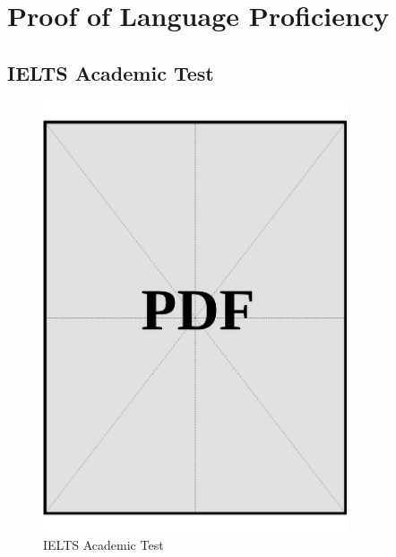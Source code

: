 \chapter{Proof of Language Proficiency}\label{sec:proof-of-language-proficiency}

\section{IELTS Academic Test}\label{sec:ielts}

\begin{figure}[ht]
  \centering
  \includegraphics[page=1, width=0.8\textwidth]{../docs/applicant/language-proficiency/english/ielts.pdf}
  \caption{IELTS Academic Test}
  \label{pdf:ielts-page1}
\end{figure}

\clearpage



